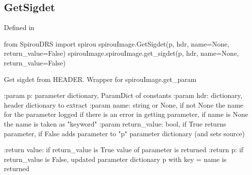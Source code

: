 \begin{minipage}{\textwidth}
\subsection{GetSigdet}

Defined in \spirouImage{}

\begin{pythonbox}
from SpirouDRS import spirou
spirouImage.GetSigdet(p, hdr, name=None, return_value=False)
spirouImage.spirouImage.get_sigdet(p, hdr, name=None, return_value=False)
\end{pythonbox}

\begin{pythondocstring}
Get sigdet from HEADER. Wrapper for spirouImage.get_param

:param p: parameter dictionary, ParamDict of constants
:param hdr: dictionary, header dictionary to extract
:param name: string or None, if not None the name for the parameter
             logged if there is an error in getting parameter, if name is
             None the name is taken as "keyword"
:param return_value: bool, if True returns parameter, if False adds
                     parameter to "p" parameter dictionary (and sets source)

:return value: if return_value is True value of parameter is returned
:return p: if return_value is False, updated parameter dictionary p with
           key = name is returned
\end{pythondocstring}
\end{minipage}


